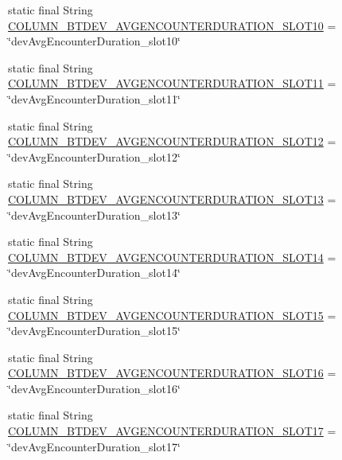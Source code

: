 \begin{DoxyCompactItemize}
\item 
static final String \hyperlink{classcom_1_1social_1_1proximity_1_1_s_q_lite_helper_a36ef1962f26aead1302bdd08da18fc76}{C\+O\+L\+U\+M\+N\+\_\+\+B\+T\+D\+E\+V\+\_\+\+A\+V\+G\+E\+N\+C\+O\+U\+N\+T\+E\+R\+D\+U\+R\+A\+T\+I\+O\+N\+\_\+\+S\+L\+O\+T10} = \char`\"{}dev\+Avg\+Encounter\+Duration\+\_\+slot10\char`\"{}
\item 
static final String \hyperlink{classcom_1_1social_1_1proximity_1_1_s_q_lite_helper_a5f9d6d711fdab1b4887213020b14908d}{C\+O\+L\+U\+M\+N\+\_\+\+B\+T\+D\+E\+V\+\_\+\+A\+V\+G\+E\+N\+C\+O\+U\+N\+T\+E\+R\+D\+U\+R\+A\+T\+I\+O\+N\+\_\+\+S\+L\+O\+T11} = \char`\"{}dev\+Avg\+Encounter\+Duration\+\_\+slot11\char`\"{}
\item 
static final String \hyperlink{classcom_1_1social_1_1proximity_1_1_s_q_lite_helper_a33f2bcc11870df8e8f78ca94d44c870a}{C\+O\+L\+U\+M\+N\+\_\+\+B\+T\+D\+E\+V\+\_\+\+A\+V\+G\+E\+N\+C\+O\+U\+N\+T\+E\+R\+D\+U\+R\+A\+T\+I\+O\+N\+\_\+\+S\+L\+O\+T12} = \char`\"{}dev\+Avg\+Encounter\+Duration\+\_\+slot12\char`\"{}
\item 
static final String \hyperlink{classcom_1_1social_1_1proximity_1_1_s_q_lite_helper_a60029078266511cdbba0b2b022ac3319}{C\+O\+L\+U\+M\+N\+\_\+\+B\+T\+D\+E\+V\+\_\+\+A\+V\+G\+E\+N\+C\+O\+U\+N\+T\+E\+R\+D\+U\+R\+A\+T\+I\+O\+N\+\_\+\+S\+L\+O\+T13} = \char`\"{}dev\+Avg\+Encounter\+Duration\+\_\+slot13\char`\"{}
\item 
static final String \hyperlink{classcom_1_1social_1_1proximity_1_1_s_q_lite_helper_aff03ab377c605903c8ebab1716ef9616}{C\+O\+L\+U\+M\+N\+\_\+\+B\+T\+D\+E\+V\+\_\+\+A\+V\+G\+E\+N\+C\+O\+U\+N\+T\+E\+R\+D\+U\+R\+A\+T\+I\+O\+N\+\_\+\+S\+L\+O\+T14} = \char`\"{}dev\+Avg\+Encounter\+Duration\+\_\+slot14\char`\"{}
\item 
static final String \hyperlink{classcom_1_1social_1_1proximity_1_1_s_q_lite_helper_a030cda34629f2ebe573a5528561b6a2a}{C\+O\+L\+U\+M\+N\+\_\+\+B\+T\+D\+E\+V\+\_\+\+A\+V\+G\+E\+N\+C\+O\+U\+N\+T\+E\+R\+D\+U\+R\+A\+T\+I\+O\+N\+\_\+\+S\+L\+O\+T15} = \char`\"{}dev\+Avg\+Encounter\+Duration\+\_\+slot15\char`\"{}
\item 
static final String \hyperlink{classcom_1_1social_1_1proximity_1_1_s_q_lite_helper_af25494a3047b9adb89340e54d94a5dc3}{C\+O\+L\+U\+M\+N\+\_\+\+B\+T\+D\+E\+V\+\_\+\+A\+V\+G\+E\+N\+C\+O\+U\+N\+T\+E\+R\+D\+U\+R\+A\+T\+I\+O\+N\+\_\+\+S\+L\+O\+T16} = \char`\"{}dev\+Avg\+Encounter\+Duration\+\_\+slot16\char`\"{}
\item 
static final String \hyperlink{classcom_1_1social_1_1proximity_1_1_s_q_lite_helper_a9a7d1eb2eb2639091df2ea97e0dfeb7d}{C\+O\+L\+U\+M\+N\+\_\+\+B\+T\+D\+E\+V\+\_\+\+A\+V\+G\+E\+N\+C\+O\+U\+N\+T\+E\+R\+D\+U\+R\+A\+T\+I\+O\+N\+\_\+\+S\+L\+O\+T17} = \char`\"{}dev\+Avg\+Encounter\+Duration\+\_\+slot17\char`\"{}

\end{DoxyCompactItemize}
